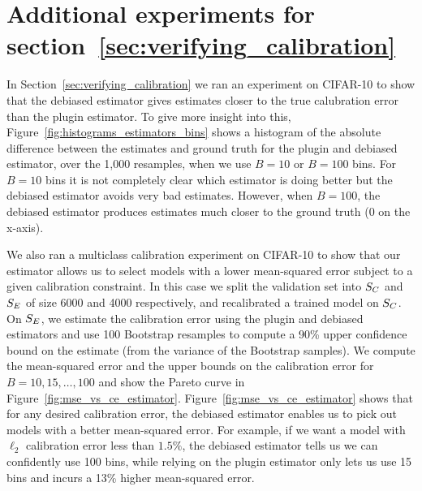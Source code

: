 \newpage

\section{Additional experiments for section~\ref{sec:verifying_calibration}}
\label{sec:verifying_calibration_appendix_experiments}

In Section~\ref{sec:verifying_calibration} we ran an experiment on CIFAR-10 to show that the debiased estimator gives estimates closer to the true calubration error than the plugin estimator. To give more insight into this, Figure~\ref{fig:histograms_estimators_bins} shows a histogram of the absolute difference between the estimates and ground truth for the plugin and debiased estimator, over the 1,000 resamples, when we use $B = 10$ or $B = 100$ bins. For $B = 10$ bins it is not completely clear which estimator is doing better but the debiased estimator avoids very bad estimates. However, when $B = 100$, the debiased estimator produces estimates much closer to the ground truth ($0$ on the x-axis).

We also ran a multiclass calibration experiment on CIFAR-10 to show that our estimator allows us to select models with a lower mean-squared error subject to a given calibration constraint. In this case we split the validation set into $S_C{}$ and $S_E{}$ of size 6000 and 4000 respectively, and recalibrated a trained model on $S_C{}$. On $S_E{}$, we estimate the calibration error using the plugin and debiased estimators and use 100 Bootstrap resamples to compute a 90\% upper confidence bound on the estimate (from the variance of the Bootstrap samples). We compute the mean-squared error and the upper bounds on the calibration error for $B = 10, 15, \dots, 100$ and show the Pareto curve in Figure~\ref{fig:mse_vs_ce_estimator}. Figure~\ref{fig:mse_vs_ce_estimator} shows that for any desired calibration error, the debiased estimator enables us to pick out models with a better mean-squared error. For example, if we want a model with $\ell_2$ calibration error less than $1.5\%$, the debiased estimator tells us we can confidently use 100 bins, while relying on the plugin estimator only lets us use 15 bins and incurs a 13\% higher mean-squared error.



